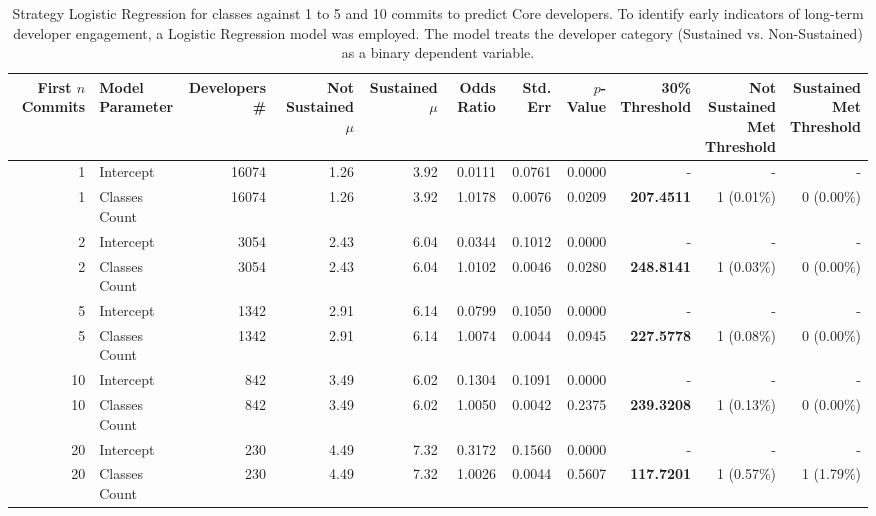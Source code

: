 \begin{landscape}
\begin{table}[H]
\centering
\setlength{\tabcolsep}{2pt}
\caption[Strategy Logistic Regression Core for classes for 1 to 5 and 10]{Strategy Logistic Regression for classes against 1 to 5 and 10 commits to predict Core developers. 
    To identify early indicators of long-term developer engagement, a Logistic Regression model was employed. The model treats the developer category (Sustained vs. Non-Sustained) as a binary dependent variable. }
\begin{tabular}{r l r r r r r r r r r}
\toprule
\makecell[t]{\textbf{First $n$}\\\textbf{Commits}} & \makecell[t]{\textbf{Model}\\\textbf{Parameter}} & \makecell[t]{\textbf{Developers}\\\textbf{\#}} & \makecell[t]{\textbf{Not}\\\textbf{Sustained}\\\textbf{$\mu$}} & \makecell[t]{\textbf{Sustained}\\\textbf{$\mu$}} & \textbf{Odds Ratio} & \textbf{Std. Err} & \textbf{$p$-Value} & \makecell[t]{\textbf{30\%}\\\textbf{Threshold}} & \makecell[t]{\textbf{Not}\\\textbf{Sustained}\\\textbf{Met}\\\textbf{Threshold}} & \makecell[t]{\textbf{Sustained}\\\textbf{Met}\\\textbf{Threshold}} \\ 
\midrule
1 & Intercept & 16074 & 1.26 & 3.92 & 0.0111 & 0.0761 & 0.0000 & - & - & - \\ 
1 & Classes Count & 16074 & 1.26 & 3.92 & 1.0178 & 0.0076 & 0.0209 & \textbf{207.4511} & 1 (0.01\%) & 0 (0.00\%) \\ 
2 & Intercept & 3054 & 2.43 & 6.04 & 0.0344 & 0.1012 & 0.0000 & - & - & - \\ 
2 & Classes Count & 3054 & 2.43 & 6.04 & 1.0102 & 0.0046 & 0.0280 & \textbf{248.8141} & 1 (0.03\%) & 0 (0.00\%) \\ 
5 & Intercept & 1342 & 2.91 & 6.14 & 0.0799 & 0.1050 & 0.0000 & - & - & - \\ 
5 & Classes Count & 1342 & 2.91 & 6.14 & 1.0074 & 0.0044 & 0.0945 & \textbf{227.5778} & 1 (0.08\%) & 0 (0.00\%) \\ 
10 & Intercept & 842 & 3.49 & 6.02 & 0.1304 & 0.1091 & 0.0000 & - & - & - \\ 
10 & Classes Count & 842 & 3.49 & 6.02 & 1.0050 & 0.0042 & 0.2375 & \textbf{239.3208} & 1 (0.13\%) & 0 (0.00\%) \\ 
20 & Intercept & 230 & 4.49 & 7.32 & 0.3172 & 0.1560 & 0.0000 & - & - & - \\ 
20 & Classes Count & 230 & 4.49 & 7.32 & 1.0026 & 0.0044 & 0.5607 & \textbf{117.7201} & 1 (0.57\%) & 1 (1.79\%) \\ 
\bottomrule
\end{tabular}%
\label{tab:codebase_graph_latex_repository_graph_component_time_series_strategy_logistic_regressionCore_False_classes_20} 
\end{table}
\end{landscape}
\newpage 

 \newpage 

